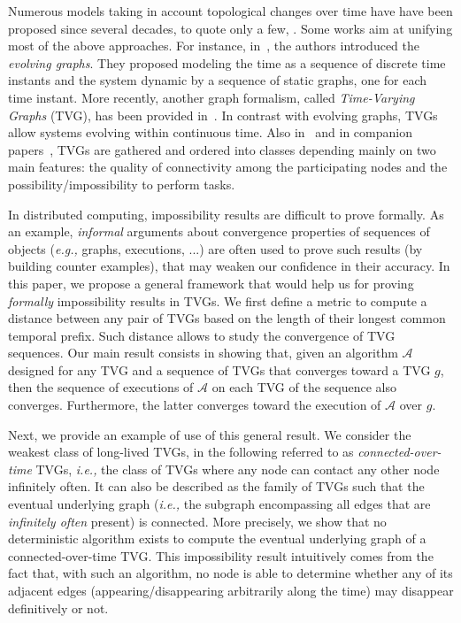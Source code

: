 \documentclass[11pt]{article}
\newcommand{\ie}{{\em i.e.,}\xspace}
\newcommand{\eg}{{\em e.g.,}\xspace}
\begin{document}
Numerous models taking in account topological changes over time have have been proposed since several decades, to
quote only a few, \cite{AKMUV12,AE84,CCF09,F03,F04,FGM07,SW09}. Some works aim at unifying most of the above
approaches. For instance, in~\cite{XFJ03}, the authors introduced the {\em evolving graphs}. They proposed modeling
the time as a sequence of discrete time instants and the system dynamic by a sequence of static graphs, one for each
time instant. More recently, another graph formalism, called {\em Time-Varying Graphs} (TVG), has been provided
in~\cite{CFQS12}. In contrast with evolving graphs, TVGs allow systems evolving within continuous time. Also
in~\cite{CFQS12} and in companion papers~\cite{CFMS10,CFMS12}, TVGs are gathered and ordered into classes depending
mainly on two main features: the quality of connectivity among the participating nodes and the
possibility/impossibility to perform tasks.

In distributed computing, impossibility results are difficult to prove formally. As an example, \emph{informal} arguments about convergence properties of sequences of objects (\eg graphs, executions, ...) are often used to prove such results (by building counter examples), that may weaken our confidence in their accuracy. In this paper, we propose a general framework that would help us for proving \emph{formally} impossibility results in TVGs. We first define a metric to compute a distance between any pair of TVGs based on the length of their longest common temporal prefix. Such distance allows to study the convergence of TVG sequences. Our main result consists in showing that, given an algorithm $\mathcal{A}$ designed for any TVG and a sequence of TVGs that converges toward a TVG $g$, then the sequence of executions of $\mathcal{A}$ on each TVG of the sequence also converges. Furthermore, the latter converges toward the execution of $\mathcal{A}$ over $g$. 

Next, we provide an example of use of this general result. We consider the weakest class of long-lived TVGs, in the
following referred to as \emph{connected-over-time} TVGs, \ie the class of TVGs where any node can contact any other node infinitely often. It can also be described as the family of TVGs such that the eventual underlying graph (\ie the subgraph encompassing all edges that are \emph{infinitely often} present) is connected. More precisely, we show that no deterministic algorithm exists to compute the eventual underlying graph of a connected-over-time TVG. This impossibility result intuitively comes from the fact that, with such an algorithm, no node is able to determine whether any of its adjacent edges (appearing/disappearing arbitrarily along the time) may disappear definitively or not.
\end{document}
